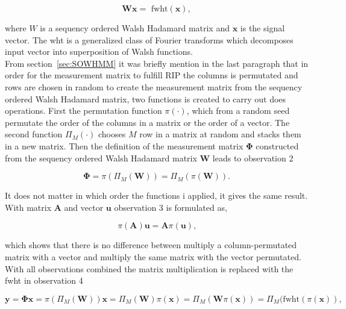 \begin{equation}
\mathbf{W}\mathbf{x} = \text{ fwht}(\mathbf{x}),
\end{equation}

where $W$ is a sequency ordered Walsh Hadamard matrix and $\mathbf{x}$ is the signal vector. The wht is a generalized class of Fourier transforms which decomposes input vector into superposition of Walsh functions.\\[0.1in]

From section~\ref{sec:SOWHMM} it was briefly mention in the last paragraph that in order for the measurement matrix to fulfill RIP the columns is permutated and rows are chosen in random to create the measurement matrix from the sequency ordered Walsh Hadamard matrix, two functions is created to carry out does operations. First the permutation function $\pi(\cdot)$, which from a random seed permutate the order of the columns in a matrix or the order of a vector. The second function $\Pi_M(\cdot)$ chooses $M$ row in a matrix at random and stacks them in a new matrix. Then the definition of the measurement matrix $\mathbf{\Phi}$ constructed from the sequency ordered Walsh Hadamard matrix $\mathbf{W}$ leads to observation 2

\begin{equation}
\mathbf{\Phi} = \pi(\Pi_M(\mathbf{W})) = \Pi_M(\pi(\mathbf{W}))\text{.}
\end{equation}

It does not matter in which order the functions i applied, it gives the same result. With matrix $\mathbf{A}$ and vector $\mathbf{u}$ observation 3 is formulated as,

\begin{equation}
\pi(\mathbf{A})\mathbf{u} = \mathbf{A}\pi(\mathbf{u})\text{,}
\end{equation}

which shows that there is no difference between multiply a column-permutated matrix with a vector and multiply the same matrix with the vector permutated.\\[0.1in]

With all observations combined the matrix multiplication is replaced with the fwht in observation 4

\begin{equation}
\mathbf{y} = \mathbf{\Phi}\mathbf{x} = \pi(\Pi_M(\mathbf{W}))\mathbf{x} = \Pi_M(\mathbf{W})\pi(\mathbf{x}) = \Pi_M(\mathbf{W}\pi(\mathbf{x})) = \Pi_M(\text{fwht}(\pi(\mathbf{x}))\text{,}
\end{equation}

